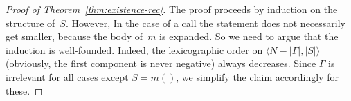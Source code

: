 \documentclass[10pt,a4paper]{amsart}
\theoremstyle{definition}
\newcommand{\chop}[0]{\raisebox{1ex}{$\frown$}}
\newcommand{\stfs}[1]{\mathsf{stf} (#1)}
\newcommand{\stfh}[2]{\mathsf{stf}(#1, #2)}
\newcommand{\Skip}{\mbox{\bf skip}}
\newcommand{\judge}[2]{#1 : #2}
\newcommand{\sequent}[2]{#1 \>\vdash\> #2}
\begin{document}
\begin{proof}[Proof of Theorem~\ref{thm:existence-rec}]
  The proof proceeds by induction on the structure of~$S$. However, In
  the case of a call the statement does not necessarily get smaller,
  because the body of~$m$ is expanded. So we need to argue that the
  induction is well-founded. Indeed, the lexicographic order on
  $\langle N-\left|\Gamma\right|,\left|S\right|\rangle$ (obviously,
  the first component is never negative) always decreases. Since
  $\Gamma$ is irrelevant for all cases except $S=m()$, we simplify the
  claim accordingly for these.

  

\end{proof}
\end{document}
